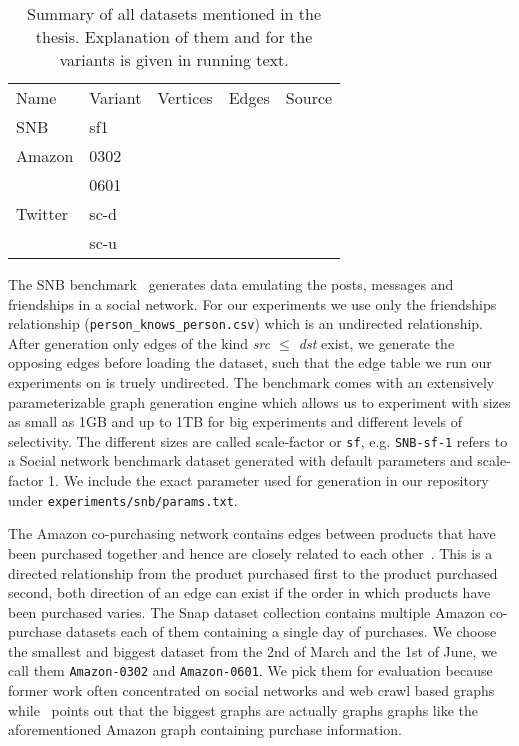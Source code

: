 \begin{table}[]  %
    \begin{tabular}{lllll}
        Name    & Variant & Vertices & Edges & Source          \\
        SNB     & sf1     &          &       & \cite{snb}      \\
        Amazon  & 0302    &          &       & \cite{snapnets} \\
                & 0601    &          &       & \cite{snapnets} \\
        Twitter & sc-d    &          &       & \cite{snapnets} \\
                & sc-u    &          &       & \cite{snapnets}
    \end{tabular}
    \caption{Summary of all datasets mentioned in the thesis.
      Explanation of them and for the variants is given in running text.
    }
    \label{table:datasets}
\end{table}


The SNB benchmark~\cite{snb} generates data emulating the posts, messages and friendships in a social network.
For our experiments we use only the friendships relationship (\texttt{person\_knows\_person.csv}) which is an undirected relationship.
After generation only edges of the kind \textit{src $\le$ dst} exist, we generate the opposing edges before loading the dataset, such that the edge table we run our experiments
on is truely undirected.
The benchmark comes with an extensively parameterizable graph generation engine
which allows us to experiment with sizes as small as 1GB and up to 1TB for big experiments and different levels of selectivity.
The different sizes are called scale-factor or \texttt{sf}, e.g. \texttt{SNB-sf-1} refers to a Social network benchmark dataset generated with
default parameters and scale-factor 1.
We include the exact parameter used for generation in our repository under \texttt{experiments/snb/params.txt}. %

The Amazon co-purchasing network contains edges between products that have been purchased together and hence are closely related to each other~\cite{snapnets}.
This is a directed relationship from the product purchased first to the product purchased second, both direction of an edge can exist if the order in which
products have been purchased varies.
The Snap dataset collection contains multiple Amazon co-purchase datasets each of them containing a single day of purchases.
We choose the smallest and biggest dataset from the 2nd of March and the 1st of June, we call them \texttt{Amazon-0302} and \texttt{Amazon-0601}.
We pick them for evaluation because former work often concentrated on social networks and web crawl based graphs~\cite{myria-detailed,ammar2018distributed}
while~\cite{salihoglu2018} points out that the biggest graphs are actually graphs graphs like the aforementioned Amazon graph containing purchase information.

